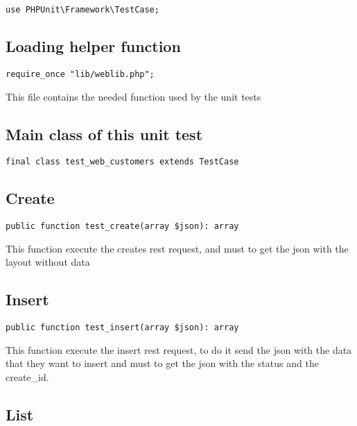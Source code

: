 \documentclass[a4paper]{book}
\begin{document}
\begin{lstlisting}
use PHPUnit\Framework\TestCase;
\end{lstlisting}

\hypertarget{toc57}{}
\subsection{Loading helper function}

\begin{lstlisting}
require_once "lib/weblib.php";
\end{lstlisting}

This file contains the needed function used by the unit tests

\hypertarget{toc58}{}
\subsection{Main class of this unit test}

\begin{lstlisting}
final class test_web_customers extends TestCase
\end{lstlisting}

\hypertarget{toc59}{}
\subsection{Create}

\begin{lstlisting}
public function test_create(array $json): array
\end{lstlisting}

This function execute the creates rest request, and must to get the
json with the layout without data

\hypertarget{toc60}{}
\subsection{Insert}

\begin{lstlisting}
public function test_insert(array $json): array
\end{lstlisting}

This function execute the insert rest request, to do it send the json with
the data that they want to insert and must to get the json with the status
and the create\_id.

\hypertarget{toc61}{}
\subsection{List}
\end{document}
